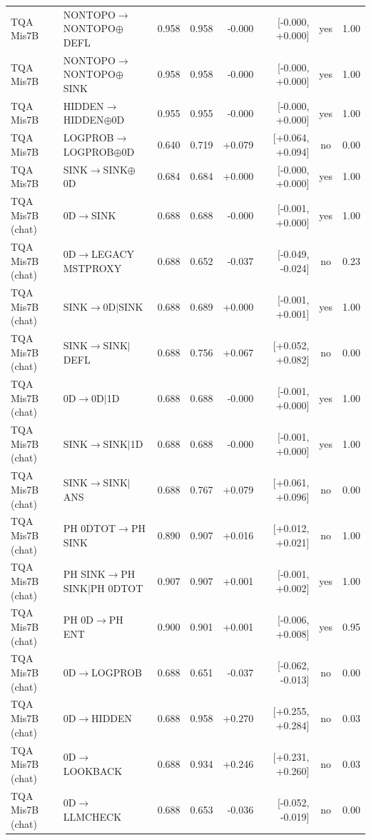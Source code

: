 \begin{longtable}{llrrrrcc}
TQA Mis7B & NONTOPO$\to$NONTOPO$\oplus$DEFL & 0.958 & 0.958 & -0.000 & [-0.000, +0.000] & yes & 1.00 \\
TQA Mis7B & NONTOPO$\to$NONTOPO$\oplus$SINK & 0.958 & 0.958 & -0.000 & [-0.000, +0.000] & yes & 1.00 \\
TQA Mis7B & HIDDEN$\to$HIDDEN$\oplus$0D & 0.955 & 0.955 & -0.000 & [-0.000, +0.000] & yes & 1.00 \\
TQA Mis7B & LOGPROB$\to$LOGPROB$\oplus$0D & 0.640 & 0.719 & +0.079 & [+0.064, +0.094] & no & 0.00 \\
TQA Mis7B & SINK$\to$SINK$\oplus$0D & 0.684 & 0.684 & +0.000 & [-0.000, +0.000] & yes & 1.00 \\
TQA Mis7B (chat) & 0D$\to$SINK & 0.688 & 0.688 & -0.000 & [-0.001, +0.000] & yes & 1.00 \\
TQA Mis7B (chat) & 0D$\to$LEGACY MSTPROXY & 0.688 & 0.652 & -0.037 & [-0.049, -0.024] & no & 0.23 \\
TQA Mis7B (chat) & SINK$\to$0D$\mid$SINK & 0.688 & 0.689 & +0.000 & [-0.001, +0.001] & yes & 1.00 \\
TQA Mis7B (chat) & SINK$\to$SINK$\mid$DEFL & 0.688 & 0.756 & +0.067 & [+0.052, +0.082] & no & 0.00 \\
TQA Mis7B (chat) & 0D$\to$0D$\mid$1D & 0.688 & 0.688 & -0.000 & [-0.001, +0.000] & yes & 1.00 \\
TQA Mis7B (chat) & SINK$\to$SINK$\mid$1D & 0.688 & 0.688 & -0.000 & [-0.001, +0.000] & yes & 1.00 \\
TQA Mis7B (chat) & SINK$\to$SINK$\mid$ANS & 0.688 & 0.767 & +0.079 & [+0.061, +0.096] & no & 0.00 \\
TQA Mis7B (chat) & PH 0DTOT$\to$PH SINK & 0.890 & 0.907 & +0.016 & [+0.012, +0.021] & no & 1.00 \\
TQA Mis7B (chat) & PH SINK$\to$PH SINK$\mid$PH 0DTOT & 0.907 & 0.907 & +0.001 & [-0.001, +0.002] & yes & 1.00 \\
TQA Mis7B (chat) & PH 0D$\to$PH ENT & 0.900 & 0.901 & +0.001 & [-0.006, +0.008] & yes & 0.95 \\
TQA Mis7B (chat) & 0D$\to$LOGPROB & 0.688 & 0.651 & -0.037 & [-0.062, -0.013] & no & 0.00 \\
TQA Mis7B (chat) & 0D$\to$HIDDEN & 0.688 & 0.958 & +0.270 & [+0.255, +0.284] & no & 0.03 \\
TQA Mis7B (chat) & 0D$\to$LOOKBACK & 0.688 & 0.934 & +0.246 & [+0.231, +0.260] & no & 0.03 \\
TQA Mis7B (chat) & 0D$\to$LLMCHECK & 0.688 & 0.653 & -0.036 & [-0.052, -0.019] & no & 0.00 \\

\end{longtable}
